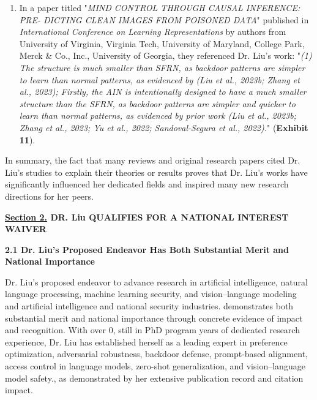 \documentclass{article}
\begin{document}
\begin{enumerate}[label=• ]
    \item In a paper titled "\textit{MIND CONTROL THROUGH CAUSAL INFERENCE: PRE- DICTING CLEAN IMAGES FROM POISONED DATA}" published in \textit{International Conference on Learning Representations} by authors from University of Virginia, Virginia Tech, University of Maryland, College Park, Merck \& Co., Inc., University of Georgia, they referenced Dr. Liu's work: "\textit{(1) The structure is much smaller than SFRN, as backdoor patterns are simpler to learn than normal patterns, as evidenced by (Liu et al., 2023b; Zhang et al., 2023); Firstly, the AIN is intentionally designed to have a much smaller structure than the SFRN, as backdoor patterns are simpler and quicker to learn than normal patterns, as evidenced by prior work (Liu et al., 2023b; Zhang et al., 2023; Yu et al., 2022; Sandoval-Segura et al., 2022).}" (\textbf{Exhibit 11}).
\end{enumerate}




In summary, the fact that many reviews and original research papers cited Dr. Liu's studies to explain their theories or results proves that Dr. Liu's works have significantly influenced her dedicated fields and inspired many new research directions for her peers.







{\bf \underline{Section 2.} DR. Liu QUALIFIES FOR A NATIONAL INTEREST WAIVER}

{\bf 2.1 Dr. Liu's Proposed Endeavor Has Both Substantial Merit and National Importance}

Dr. Liu's proposed endeavor to advance research in artificial intelligence, natural language processing, machine learning security, and vision–language modeling and artificial intelligence and national security industries. demonstrates both substantial merit and national importance through concrete evidence of impact and recognition. With over 0, still in PhD program years of dedicated research experience, Dr. Liu has established herself as a leading expert in preference optimization, adversarial robustness, backdoor defense, prompt-based alignment, access control in language models, zero-shot generalization, and vision–language model safety., as demonstrated by her extensive publication record and citation impact.
\end{document}
